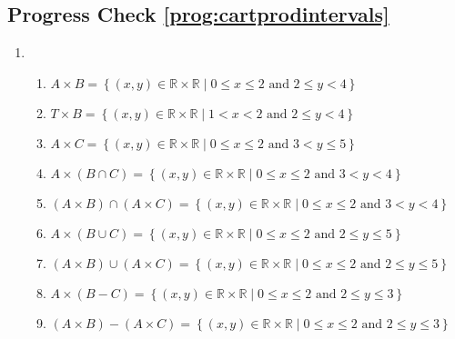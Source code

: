 \subsection*{Progress Check \ref{prog:cartprodintervals}}
\begin{enumerate}
\item \begin{enumerate}
\item $A \times B = \left\{ {\left( {x,y} \right) \in \mathbb{R} \times \mathbb{R} \mid {0 \leq x \leq 2\text{ and }2 \leq y < 4} } \right\}$

\item $T \times B = \left\{ {\left( {x,y} \right) \in \mathbb{R} \times \mathbb{R} \mid {1 < x < 2\text{ and }2 \leq y < 4} } \right\}$

\item $A \times C = \left\{ {\left( {x,y} \right) \in \mathbb{R} \times \mathbb{R} \mid {0 \leq x \leq 2\text{ and } 3 < y \leq 5} } \right\}$

\item $A \times \left( {B \cap C} \right) = \left\{ {\left( {x,y} \right) \in \mathbb{R} \times \mathbb{R} \mid {0 \leq x \leq 2\text{ and } 3 < y < 4} } \right\}$

\item $\left( {A \times B} \right) \cap \left( {A \times C} \right) = \left\{ {\left( {x,y} \right) \in \mathbb{R} \times \mathbb{R} \mid {0 \leq x \leq 2\text{ and } 3 < y < 4} } \right\}$

\item $A \times \left( {B \cup C} \right) = \left\{ {\left( {x,y} \right) \in \mathbb{R} \times \mathbb{R} \mid {0 \leq x \leq 2\text{ and 2} \leq y \leq 5} } \right\}$

\item $\left( {A \times B} \right) \cup \left( {A \times C} \right) = \left\{ {\left( {x,y} \right) \in \mathbb{R} \times \mathbb{R} \mid {0 \leq x \leq 2\text{ and 2} \leq y \leq 5} } \right\}$

\item $A \times \left( {B - C} \right) = \left\{ {\left( {x,y} \right) \in \mathbb{R} \times \mathbb{R} \mid {0 \leq x \leq 2\text{ and }  2 \leq y \leq 3} } \right\}$

\item $\left( {A \times B} \right) - \left( {A \times C} \right) = \left\{ {\left( {x,y} \right) \in \mathbb{R} \times \mathbb{R} \mid {0 \leq x \leq 2\text{ and } 2 \leq y \leq 3} } \right\}$


\end{enumerate}
\end{enumerate}
